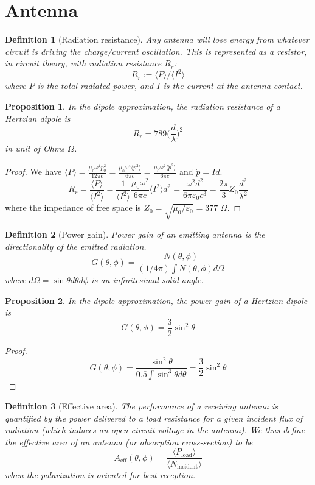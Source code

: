 \documentclass[a4paper]{article}
\theoremstyle{new}
\newtheorem{defi}{Definition}[section]
\newtheorem{prop}{Proposition}[section]
\begin{document}
\section{Antenna}
\begin{defi}[Radiation resistance]
Any antenna will lose energy from whatever circuit is driving the charge/current oscillation. This is represented as a resistor, in circuit theory, with radiation resistance $R_r$:
$$R_r:=\langle P\rangle/\langle I^2\rangle$$
where $P$ is the total radiated power, and $I$ is the current at the antenna contact.
\end{defi}
\begin{prop}
In the dipole approximation, the radiation resistance of a Hertzian dipole is
$$R_r=789\bigg(\frac{d}{\lambda}\bigg)^2$$
in unit of Ohms $\Omega$.
\end{prop}
\begin{proof}
We have $\langle P\rangle=\frac{\mu_0\omega^4p_0^2}{12\pi c}=\frac{\mu_0\omega^4\langle p^2\rangle}{6\pi c}=\frac{\mu_0\omega^2\langle\dot{p}^2\rangle}{6\pi c}$ and $\dot{p}=Id$.
$$R_r=\frac{\langle P\rangle}{\langle I^2\rangle}=\frac{1}{\langle I^2\rangle}\frac{\mu_0\omega^2}{6\pi c}\langle I^2\rangle d^2=\frac{\omega^2d^2}{6\pi\varepsilon_0c^3}=\frac{2\pi}{3}Z_0\frac{d^2}{\lambda^2}$$
where the impedance of free space is $Z_0=\sqrt{\mu_0/\varepsilon_0}=377$ $\Omega$.
\end{proof}
\begin{defi}[Power gain]
Power gain of an emitting antenna is the directionality of the emitted radiation.
$$G(\theta,\phi)=\frac{N(\theta,\phi)}{(1/4\pi)\int N(\theta,\phi)d\Omega}$$
where $d\Omega=\sin\theta d\theta d\phi$ is an infinitesimal solid angle.
\end{defi}
\begin{prop}
In the dipole approximation, the power gain of a Hertzian dipole is
$$G(\theta,\phi)=\frac{3}{2}\sin^2\theta$$
\end{prop}
\begin{proof}
$$G(\theta,\phi)=\frac{\sin^2\theta}{0.5\int\sin^3\theta d\theta}=\frac{3}{2}\sin^2\theta$$
\end{proof}
\begin{defi}[Effective area]
The performance of a receiving antenna is quantified by the power delivered to a load resistance for a given incident flux of radiation (which induces an open circuit voltage in the antenna). We thus define the effective area of an antenna (or absorption cross-section) to be
$$A_{\text{eff}}(\theta,\phi)=\frac{\langle P_{\text{load}}\rangle}{\langle N_{\text{incident}}\rangle}$$
when the polarization is oriented for best reception.
\end{defi}
\end{document}
